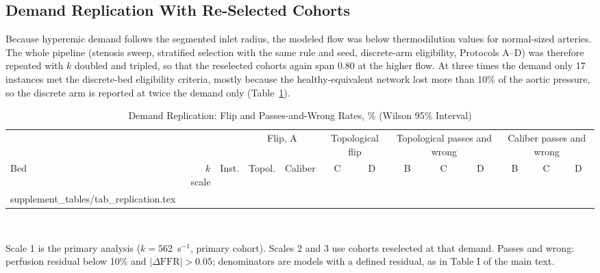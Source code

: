 \documentclass[journal,twoside,web,onecolumn]{ieeecolor}
\begin{document}
\subsection{Demand Replication With Re-Selected Cohorts}\label{sec:replication}
Because hyperemic demand follows the segmented inlet radius, the modeled flow was below thermodilution values for
normal-sized arteries. The whole pipeline (stenosis sweep, stratified selection with the same rule and seed,
discrete-arm eligibility, Protocols A--D) was therefore repeated with $k$ doubled and tripled, so that the reselected
cohorts again span 0.80 at the higher flow. At three times the demand only 17 instances met the discrete-bed
eligibility criteria, mostly because the healthy-equivalent network lost more than 10\% of the aortic pressure, so the
discrete arm is reported at twice the demand only (Table~\ref{tab:repl}).
\begin{table}[!ht]
\caption{Demand Replication: Flip and Passes-and-Wrong Rates, \% (Wilson 95\% Interval)}\label{tab:repl}
\centering\footnotesize\setlength{\tabcolsep}{3pt}
\begin{tabular}{@{}lrrcccccccccc@{}}
\toprule
 & & & \multicolumn{2}{c}{Flip, A} & \multicolumn{2}{c}{Topological flip} & \multicolumn{3}{c}{Topological passes and wrong} & \multicolumn{3}{c}{Caliber passes and wrong}\\
\cmidrule(lr){4-5}\cmidrule(lr){6-7}\cmidrule(lr){8-10}\cmidrule(l){11-13}
Bed & $k$ scale & Inst. & Topol. & Caliber & C & D & B & C & D & B & C & D\\
\midrule
{} supplement_tables/tab_replication.tex 
\bottomrule
\end{tabular}
\\[3pt]
\parbox{0.95\textwidth}{\footnotesize Scale 1 is the primary analysis ($k = 562$~s$^{-1}$, primary cohort). Scales 2 and 3 use
cohorts reselected at that demand. Passes and wrong: perfusion residual below 10\% and $|\Delta\mathrm{FFR}| > 0.05$;
denominators are models with a defined residual, as in Table I of the main text.}
\end{table}

\FloatBarrier
\end{document}
